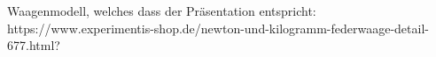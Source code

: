 \documentclass[preview]{standalone}
\begin{document}
\begin{center}
Waagenmodell, welches dass der Präsentation entspricht: https://www.experimentis-shop.de/newton-und-kilogramm-federwaage-detail-677.html?
\end{center}
\end{document}
